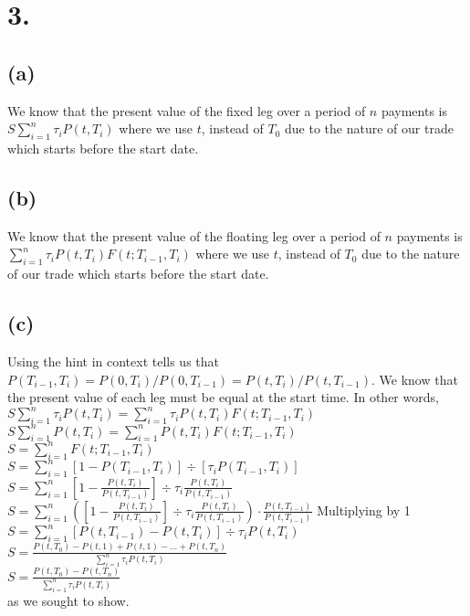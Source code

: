 \documentclass{article}
\begin{document}
\section*{3.}
{\Large 

\subsection*{(a)}

We know that the present value of the fixed leg over a period of $n$ payments is $S\sum_{i=1}^{n} \tau_i P(t, T_i)$ where we use $t$, instead of $T_0$ due to the nature of our trade which starts before the start date. 

\subsection*{(b)}

We know that the present value of the floating leg over a period of $n$ payments is $\sum_{i=1}^{n} \tau_i P(t, T_i)F(t; T_{i-1}, T_i)$ where we use $t$, instead of $T_0$ due to the nature of our trade which starts before the start date. 

\subsection*{(c)}

Using the hint in context tells us that $P(T_{i-1}, T_i) = P(0, T_i) / P(0, T_{i-1}) = P(t, T_i) / P(t, T_{i-1})$. We know that the present value of each leg must be equal at the start time. In other words, \\
$S\sum_{i=1}^{n} \tau_i P(t, T_i) = \sum_{i=1}^{n} \tau_i P(t, T_i)F(t; T_{i-1}, T_i)$ \\ 
$S\sum_{i=1}^{n} P(t, T_i) = \sum_{i=1}^{n} P(t, T_i)F(t; T_{i-1}, T_i)$ \\ 
$S = \sum_{i=1}^{n} F(t; T_{i-1}, T_i)$ \\ 
$S = \sum_{i=1}^{n} [1 - P(T_{i-1}, T_i)] \div [\tau_iP(T_{i-1}, T_i)]$ \\ 
$S = \sum_{i=1}^{n} [1 - \frac{P(t, T_i)}{P(t, T_{i-1})}] \div \tau_i \frac{P(t, T_i)}{P(t, T_{i-1})}$ \\ 
$S = \sum_{i=1}^{n} ([1 - \frac{P(t, T_i)}{P(t, T_{i-1})}] \div \tau_i \frac{P(t, T_i)}{P(t, T_{i-1})})\cdot \frac{P(t, T_{i-1})}{P(t, T_{i-1})}$ \hfill Multiplying by 1 \\ 
$S = \sum_{i=1}^{n} [P(t, T_{i-1}) - P(t, T_i)] \div \tau_i P(t, T_i)  $ \\ 
$S = \frac{P(t, T_0) - P(t, 1) + P(t, 1) - \dots + P(t, T_n)}{\sum_{i=1}^{n} \tau_i P(t, T_i)}  $ \\ 
$S = \frac{P(t, T_0) - P(t, T_n)}{\sum_{i=1}^{n} \tau_i P(t, T_i)} $ \\
as we sought to show.

}
\end{document}
